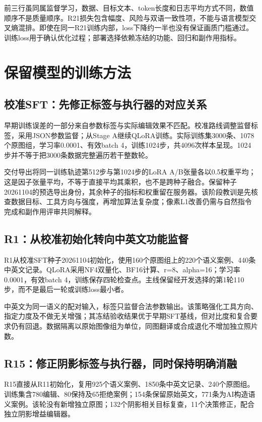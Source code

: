\documentclass[UTF8,fontset=none,zihao=5,a4paper]{ctexart}
\begin{document}
前三行虽同属监督学习，数据、目标文本、token长度和日志平均方式不同，数值顺序不是质量顺序。R21损失包含幅度、风险与双语一致性项，不能与语言模型交叉熵混排。即使在同一R21训练内部，loss下降约一半也没有保证画质门槛通过。训练loss用于确认优化过程；部署选择依赖冻结的功能、回归和副作用指标。

\section{保留模型的训练方法}
\subsection{校准SFT：先修正标签与执行器的对应关系}
早期训练误差的一部分来自参数标签与实际编辑效果不匹配。校准路线调整监督标签，采用JSON参数监督；从Stage A继续QLoRA训练。实际训练集3000条、1078个原图组，学习率0.0001、有效batch 4，训练1024步，共4096次样本呈现。1024步并不等于把3000条数据完整遍历若干整数轮。

交付导出将同一训练轨迹第512步与第1024步的LoRA A/B张量各以0.5权重平均；这是因子张量平均，不等于直接平均其乘积，也不是跨种子融合。保留种子20261104的预选导出身份，其余种子的指标和权重留在服务器。该阶段教训是先核查数据目标、工具方向与强度，再增加算法复杂度；像素L1改善仍需与自然指令完成和副作用评审共同解释。

\subsection{R1：从校准初始化转向中英文功能监督}
R1从校准SFT种子20261104初始化，使用160个原图组上的220个语义案例、440条中英文记录。QLoRA采用NF4双量化、BF16计算、r=8、alpha=16；学习率0.0001，有效batch 4，训练保存四轮检查点。主线保留经开发选择的第1轮110步，而不是最后一轮或训练loss最小者。

中英文为同一语义的配对输入，标签只监督合法参数输出。该策略强化工具方向、指定力度及不做无关增强；其冻结验收结果优于早期SFT基线，但对比度和复合要求仍有回退。数据隔离以原始图像组为单位，同图翻译或合成退化不增加独立照片数。

\subsection{R15：修正阴影标签与执行器，同时保持明确消融}
R15直接从R11初始化，复用925个语义案例、1850条中英文记录、240个原图组。训练集含780编辑、80保持及65拒绝案例；154条保留原始英文，771条为AI构造语义案例。该轮没有新增独立原图；132个阴影相关目标复查，11个决策修正，配合独立阴影增益编辑器。
\end{document}
